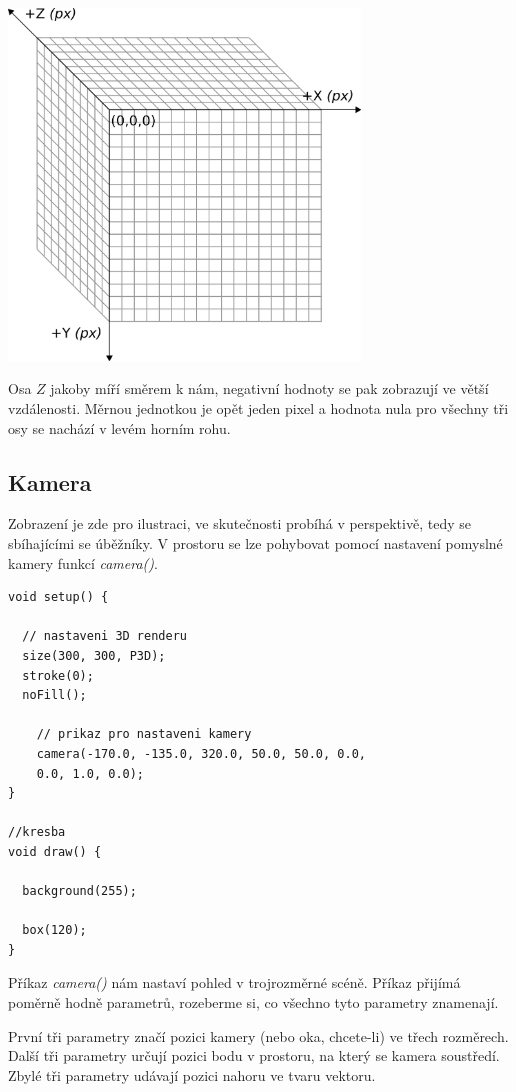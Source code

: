 \documentclass[10pt,twoside=true,open=right,cleardoublepage=empty,chapterprefix=true]{scrbook}
\newcommand{\pododdil}[1]{\subsection{#1}\index{#1}\label{#1}}
\newcommand{\vyraz}[1]{\textit{\gls{#1}}\index{#1}\label{#1}}
\begin{document}
\vfill



\begin{center}
\includegraphics[width = 0.7\textwidth]{imgs/3d.png}
\end{center}

Osa $Z$ jakoby míří směrem k nám, negativní hodnoty se pak zobrazují ve větší vzdálenosti. Měrnou jednotkou je opět jeden pixel a hodnota nula pro všechny tři osy se nachází v levém horním rohu.

\pododdil{Kamera}

Zobrazení je zde pro ilustraci, ve skutečnosti probíhá v perspektivě, tedy se sbíhajícími se úběžníky. V prostoru se lze pohybovat pomocí nastavení pomyslné kamery funkcí \vyraz{camera()}.

\begin{lstlisting}
void setup() {

  // nastaveni 3D renderu
  size(300, 300, P3D);
  stroke(0);
  noFill();

    // prikaz pro nastaveni kamery 
    camera(-170.0, -135.0, 320.0, 50.0, 50.0, 0.0, 
    0.0, 1.0, 0.0);
}

//kresba
void draw() {

  background(255);
  
  box(120);
}
\end{lstlisting}

Příkaz \vyraz{camera()} nám nastaví pohled v trojrozměrné scéně. Příkaz přijímá poměrně hodně parametrů, rozeberme si, co všechno tyto parametry znamenají.

První tři parametry značí pozici kamery (nebo oka, chcete-li) ve třech rozměrech. Další tři parametry určují pozici bodu v prostoru, na který se kamera soustředí. Zbylé tři parametry udávají pozici nahoru ve tvaru vektoru.
\end{document}
